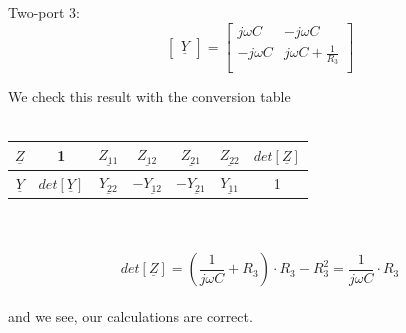 \documentclass[a4paper]{article}
\begin{document}
Two-port 3:
\begin{equation*}
	\begin{bmatrix}
		\underline{Y}
	\end{bmatrix}=
	\begin{bmatrix}
		j\omega C & -j\omega C\\
		-j\omega C & j\omega C + \frac{1}{R_3}\\
	\end{bmatrix}
\end{equation*}

We check this result with the conversion table\\\\
\begin{tabular}{c|c|c|c|c|c|c}
	$\underline{Z}$ & 1 & $\underline{Z_{11}}$ & $\underline{Z_{12}}$ & $\underline{Z_{21}}$ & $\underline{Z_{22}}$ & $det[\underline{Z}]$\\[1ex]
	\hline 
	$\underline{Y}$ & $det[\underline{Y}]$ & $\underline{Y_{22}}$ & $-\underline{Y_{12}}$ & $-\underline{Y_{21}}$ & $\underline{Y_{11}}$ & 1\\[1ex]
\end{tabular}\\\\

\begin{equation*}
	det[\underline{Z}] = (\frac{1}{j\omega C} + R_3) \cdot R_3 - R_3^2 = \frac{1}{j\omega C} \cdot R_3
\end{equation*}
\\
and we see, our calculations are correct.\\
\end{document}
